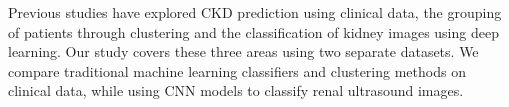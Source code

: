 Previous studies have explored CKD prediction using clinical data, the grouping of patients through clustering and the classification of kidney images using deep learning. Our study covers these three areas using two separate datasets. We compare traditional machine learning classifiers and clustering methods on clinical data, while using CNN models to classify renal ultrasound images.


